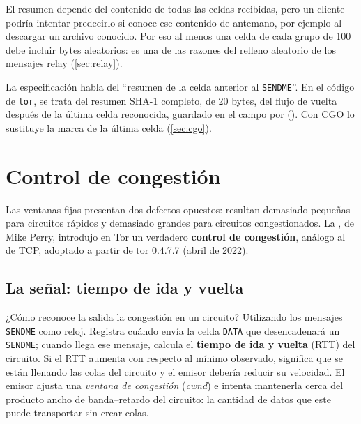 El resumen depende del contenido de todas las celdas recibidas, pero un cliente podría intentar predecirlo si conoce ese contenido de antemano, por ejemplo al descargar un archivo conocido. Por eso al menos una celda de cada grupo de 100 debe incluir bytes aleatorios: es una de las razones del relleno aleatorio de los mensajes relay (\cref{sec:relay}).

\begin{approfondimento}
La especificación habla del \enquote{resumen de la celda anterior al \texttt{SENDME}}. En el código de \texttt{tor}, se trata del resumen SHA-1 completo, de 20 bytes, del flujo de vuelta después de la última celda reconocida, guardado en el campo  por  (). Con CGO lo sustituye la marca de la última celda (\cref{sec:cgo}).
\end{approfondimento}

\section{Control de congestión}\label{sec:cc}

Las ventanas fijas presentan dos defectos opuestos: resultan demasiado pequeñas para circuitos rápidos y demasiado grandes para circuitos congestionados. La , de Mike Perry, introdujo en Tor un verdadero \textbf{control de congestión}, análogo al de TCP, adoptado a partir de tor 0.4.7.7 (abril de 2022).

\subsection{La señal: tiempo de ida y vuelta}

¿Cómo reconoce la salida la congestión en un circuito? Utilizando los mensajes \texttt{SENDME} como reloj. Registra cuándo envía la celda \texttt{DATA} que desencadenará un \texttt{SENDME}; cuando llega ese mensaje, calcula el \textbf{tiempo de ida y vuelta} (RTT) del circuito. Si el RTT aumenta con respecto al mínimo observado, significa que se están llenando las colas del circuito y el emisor debería reducir su velocidad. El emisor ajusta una \emph{ventana de congestión} (\emph{cwnd}) e intenta mantenerla cerca del producto ancho de banda--retardo del circuito: la cantidad de datos que este puede transportar sin crear colas.

